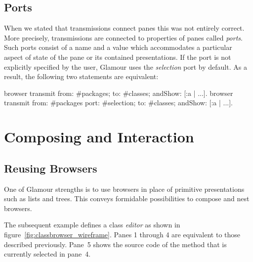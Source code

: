 \documentclass[a4paper,10pt,twoside]{book}
\begin{document}
\subsection{Ports}

When we stated that transmissions connect panes this was not entirely
correct. More precisely, transmissions are connected to properties of
panes called \emph{ports}. Such ports consist of a name and a value
which accommodates a particular aspect of state of the pane or its
contained presentations. If the port is not explicitly specified by
the user, Glamour uses the \emph{selection} port by default. As a
result, the following two statements are equivalent:

\begin{code}{}
browser transmit from: #packages; to: #classes; andShow: [:a | ...].
browser transmit from: #packages port: #selection; to: #classes; andShow: [:a | ...].
\end{code}




\section{Composing and Interaction}

\subsection{Reusing Browsers}
\label{sec:tutorial/reusing-browsers}

One of  Glamour strengths is to use browsers in
place of primitive presentations such as lists and trees. This conveys formidable possibilities to compose and nest browsers.

The subsequent example defines a class \emph{editor} as shown
in figure~\ref{fig:classbrowser_wireframe}. Panes 1 through 4 are
equivalent to those described previously. Pane~5 shows the source code
of the method that is currently selected in pane~4.
\end{document}
